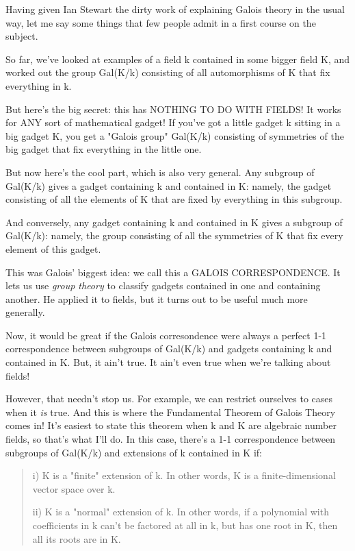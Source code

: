 Having given Ian Stewart the dirty work of explaining Galois theory in
the usual way, let me say some things that few people admit in a first
course on the subject.  

So far, we've looked at examples of a field k contained in some bigger
field K, and worked out the group Gal(K/k) consisting of all automorphisms 
of K that fix everything in k.  

But here's the big secret: this has NOTHING TO DO WITH FIELDS!  It works
for ANY sort of mathematical gadget!  If you've got a little gadget k 
sitting in a big gadget K, you get a "Galois group" Gal(K/k) consisting of 
symmetries of the big gadget that fix everything in the little one. 

But now here's the cool part, which is also very general.   Any subgroup 
of Gal(K/k) gives a gadget containing k and contained in K: namely, the 
gadget consisting of all the elements of K that are fixed by everything 
in this subgroup.

And conversely, any gadget containing k and contained in K gives a 
subgroup of Gal(K/k): namely, the group consisting of all the symmetries 
of K that fix every element of this gadget.  

This was Galois' biggest idea: we call this a GALOIS CORRESPONDENCE.
It lets us use \emph{group theory} to classify gadgets contained in one 
and containing another.  He applied it to fields, but it turns out 
to be useful much more generally.  

Now, it would be great if the Galois corresondence were always a perfect 
1-1 correspondence between subgroups of Gal(K/k) and gadgets containing
k and contained in K.  But, it ain't true.  It ain't even true when we're 
talking about fields!  

However, that needn't stop us.  For example, we can restrict ourselves 
to cases when it \emph{is} true.  
And this is where the Fundamental Theorem of 
Galois Theory comes in!  It's easiest to state this theorem when k and K 
are algebraic number fields, so that's what I'll do.  In this case, there's
a 1-1 correspondence between subgroups of Gal(K/k) and extensions of k 
contained in K if:

\begin{quote}
i) K is a "finite" extension of k.  In other words, K is a finite-dimensional
vector space over k.

ii) K is a "normal" extension of k.  In other words, if a 
polynomial with coefficients in k can't be factored at all in k, 
but has one root in K, then all its roots are in K.
\end{quote}

